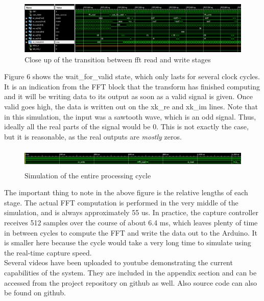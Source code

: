 \documentclass[12pt]{article}
\begin{document}
    \begin{figure}[h!]
      \centering
      \includegraphics[scale=0.4]{small_sim}
      \caption{Close up of the transition between fft read and write stages}
    \end{figure}
    
    Figure 6 shows the wait\_for\_valid state, which only lasts for several clock cycles.
    It is an indication from the FFT block that the transform has finished computing and it will be writing data to its output as soon as a valid signal is given.
    Once valid goes high, the data is written out on the xk\_re and xk\_im lines.
    Note that in this simulation, the input was a sawtooth wave, which is an odd signal.
    Thus, ideally all the real parts of the signal would be 0.
    This is not exactly the case, but it is reasonable, as the real outputs are \textit{mostly} zeros.
    
    \begin{figure}[h!]
      \centering
      \includegraphics[width=140mm,height=10mm]{cycle}
      \caption{Simulation of the entire processing cycle}
    \end{figure}
      
    The important thing to note in the above figure is the relative lengths of each stage.
    The actual FFT computation is performed in the very middle of the simulation, and is always approximately 55 us.
    In practice, the capture controller receives 512 samples over the course of about 6.4 ms, which leaves plenty of time in between cycles to compute the FFT and write the data out to the Arduino.
    It is smaller here because the cycle would take a very long time to simulate using the real-time capture speed.\\

    Several videos have been uploaded to youtube demonstrating the current capabilities of the system.
    They are included in the appendix section and can be accessed from the project repository on github as well.
    Also source code can also be found on github.
    
\end{document}

